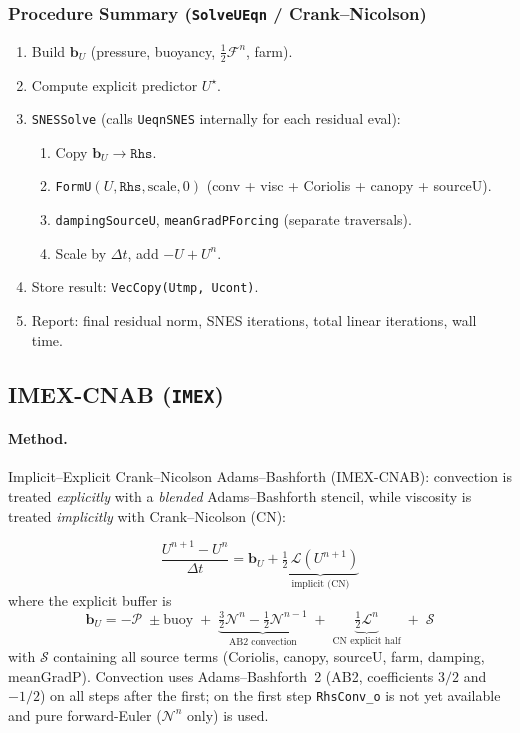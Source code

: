 \documentclass[12pt,a4paper]{article}
\newcommand{\cN}{\mathcal{N}}
\newcommand{\cL}{\mathcal{L}}
\newcommand{\cP}{\mathcal{P}}
\newcommand{\cS}{\mathcal{S}}
\newcommand{\dt}{\Delta t}
\newcommand{\half}{\tfrac{1}{2}}
\begin{document}
	\subsubsection{Procedure Summary (\texttt{SolveUEqn} / Crank--Nicolson)}
	
	\begin{enumerate}
		\item Build $\bm{b}_U$ (pressure, buoyancy, $\half\mathcal{F}^n$, farm).
		\item Compute explicit predictor $U^\star$.
		\item \texttt{SNESSolve} (calls \texttt{UeqnSNES} internally for each residual eval):
		\begin{enumerate}
			\item Copy $\bm{b}_U \to \texttt{Rhs}$.
			\item \texttt{FormU}$(U, \texttt{Rhs}, \text{scale}, 0)$
			(conv + visc + Coriolis + canopy + sourceU).
			\item \texttt{dampingSourceU}, \texttt{meanGradPForcing} (separate traversals).
			\item Scale by $\dt$, add $-U + U^n$.
		\end{enumerate}
		\item Store result: \texttt{VecCopy(Utmp, Ucont)}.
		\item Report: final residual norm, SNES iterations, total linear iterations, wall time.
	\end{enumerate}
	
	\subsection{IMEX-CNAB (\texttt{IMEX})}
	\label{sec:imex}
	
	\paragraph{Method.}
	Implicit--Explicit Crank--Nicolson Adams--Bashforth (IMEX-CNAB):
	convection is treated \emph{explicitly} with a \emph{blended} Adams--Bashforth
	stencil, while viscosity is treated \emph{implicitly} with
	Crank--Nicolson (CN):
	
	\begin{equation}
		\boxed{
			\frac{U^{n+1} - U^n}{\dt}
			= \bm{b}_U
			+ \underbrace{\half\,\cL(U^{n+1})}_{\text{implicit (CN)}}
		}
		\label{eq:IMEX}
	\end{equation}
	where the explicit buffer is
	\begin{equation}
		\bm{b}_U
		= -\cP
		\;\pm\text{buoy}
		\;+\;\underbrace{\tfrac{3}{2}\cN^n
			- \tfrac{1}{2}\cN^{n-1}}_{\text{AB2 convection}}
		\;+\;\underbrace{\half\cL^n}_{\text{CN explicit half}}
		\;+\;\cS
		\label{eq:bU}
	\end{equation}
	with $\cS$ containing all source terms (Coriolis, canopy, sourceU,
	farm, damping, meanGradP).
	Convection uses Adams--Bashforth~2 (AB2, coefficients $3/2$ and $-1/2$)
	on all steps after the first; on the first step \texttt{RhsConv\_o} is
	not yet available and pure forward-Euler ($\cN^n$ only) is used.
\end{document}
